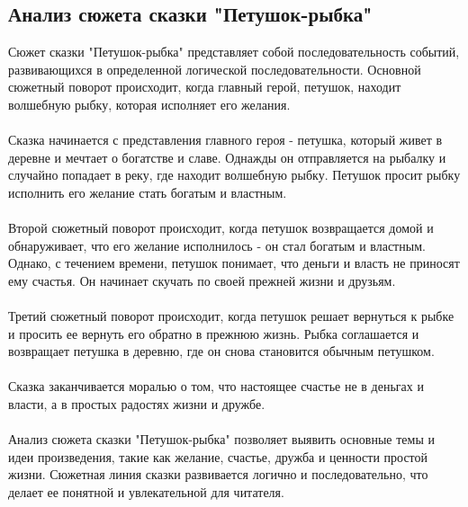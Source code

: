\documentclass{article}
\begin{document}
\subsection{Анализ сюжета сказки "{}{}Петушок-рыбка"{}{}}
Сюжет сказки "{}{}Петушок-рыбка"{}{} представляет собой последовательность событий, развивающихся в определенной логической последовательности. Основной сюжетный поворот происходит, когда главный герой, петушок, находит волшебную рыбку, которая исполняет его желания.\\
~\\
Сказка начинается с представления главного героя - петушка, который живет в деревне и мечтает о богатстве и славе. Однажды он отправляется на рыбалку и случайно попадает в реку, где находит волшебную рыбку. Петушок просит рыбку исполнить его желание стать богатым и властным.\\
~\\
Второй сюжетный поворот происходит, когда петушок возвращается домой и обнаруживает, что его желание исполнилось - он стал богатым и властным. Однако, с течением времени, петушок понимает, что деньги и власть не приносят ему счастья. Он начинает скучать по своей прежней жизни и друзьям.\\
~\\
Третий сюжетный поворот происходит, когда петушок решает вернуться к рыбке и просить ее вернуть его обратно в прежнюю жизнь. Рыбка соглашается и возвращает петушка в деревню, где он снова становится обычным петушком.\\
~\\
Сказка заканчивается моралью о том, что настоящее счастье не в деньгах и власти, а в простых радостях жизни и дружбе.\\
~\\
Анализ сюжета сказки "{}{}Петушок-рыбка"{}{} позволяет выявить основные темы и идеи произведения, такие как желание, счастье, дружба и ценности простой жизни. Сюжетная линия сказки развивается логично и последовательно, что делает ее понятной и увлекательной для читателя.
\end{document}
